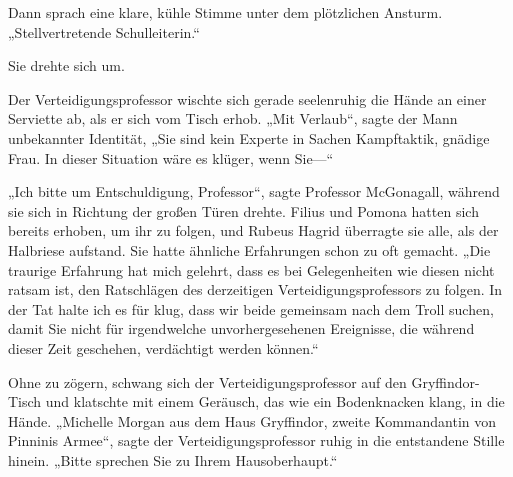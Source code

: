 
Dann sprach eine klare, kühle Stimme unter dem plötzlichen Ansturm. „Stellvertretende Schulleiterin.“

Sie drehte sich um.

Der Verteidigungsprofessor wischte sich gerade seelenruhig die Hände an einer Serviette ab, als er sich vom Tisch erhob. „Mit Verlaub“, sagte der Mann unbekannter Identität, „Sie sind kein Experte in Sachen Kampftaktik, gnädige Frau. In dieser Situation wäre es klüger, wenn Sie—“

„Ich bitte um Entschuldigung, Professor“, sagte Professor McGonagall, während sie sich in Richtung der großen Türen drehte. Filius und Pomona hatten sich bereits erhoben, um ihr zu folgen, und Rubeus Hagrid überragte sie alle, als der Halbriese aufstand. Sie hatte ähnliche Erfahrungen schon zu oft gemacht. „Die traurige Erfahrung hat mich gelehrt, dass es bei Gelegenheiten wie diesen nicht ratsam ist, den Ratschlägen des derzeitigen Verteidigungsprofessors zu folgen. In der Tat halte ich es für klug, dass wir beide gemeinsam nach dem Troll suchen, damit Sie nicht für irgendwelche unvorhergesehenen Ereignisse, die während dieser Zeit geschehen, verdächtigt werden können.“


Ohne zu zögern, schwang sich der Verteidigungsprofessor auf den Gryffindor-Tisch und klatschte mit einem Geräusch, das wie ein Bodenknacken klang, in die Hände. „Michelle Morgan aus dem Haus Gryffindor, zweite Kommandantin von Pinninis Armee“, sagte der Verteidigungsprofessor ruhig in die entstandene Stille hinein. „Bitte sprechen Sie zu Ihrem Hausoberhaupt.“

